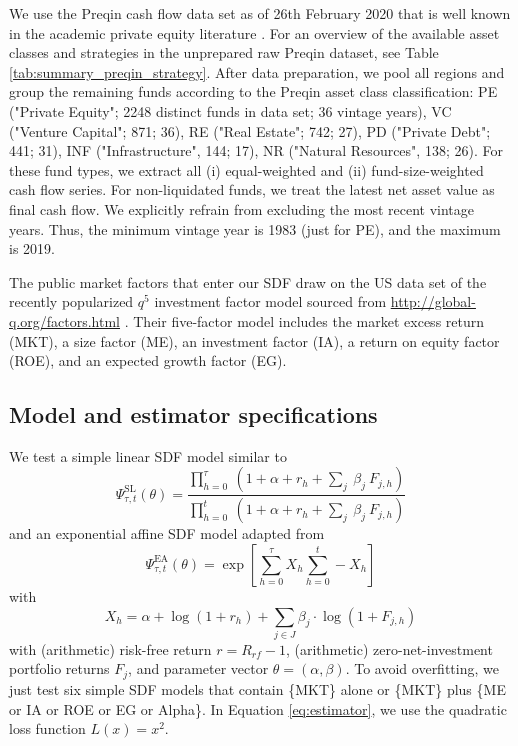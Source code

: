 \documentclass[12pt]{article}
\begin{document}
We use the Preqin cash flow data set as of 26th February 2020 that is well known in the academic private equity literature \citep{HJK14,KN16,ACGP18}.
For an overview of the available asset classes and strategies in the unprepared raw Preqin dataset, see Table  \ref{tab:summary_preqin_strategy}.
After data preparation, we pool all regions and group the remaining funds according to the Preqin asset class classification:
PE ("Private Equity"; 2248 distinct funds in data set; 36 vintage years),
VC ("Venture Capital"; 871; 36),
RE ("Real Estate"; 742; 27),
PD ("Private Debt"; 441; 31),
INF ("Infrastructure", 144; 17), 
NR ("Natural Resources", 138; 26).
For these fund types, we extract all (i) equal-weighted and (ii) fund-size-weighted cash flow series.
For non-liquidated funds, we treat the latest net asset value as final cash flow.
We explicitly refrain from excluding the most recent vintage years.
Thus, the minimum vintage year is 1983 (just for PE), and the maximum is 2019.

The public market factors that enter our SDF draw on the US data set of the recently popularized $q^5$ investment factor model sourced from \url{http://global-q.org/factors.html} \citep{HXZ15,HXZ20}. 
Their five-factor model includes the market excess return (MKT), a size factor (ME), an investment factor (IA), a return on equity factor (ROE), and an expected growth factor (EG).

\subsection{Model and estimator specifications}
\label{sec:model_selection}

We test a simple linear SDF model similar to \cite{DLP12}
\begin{equation}
\label{eq:linear_sdf}
\Psi_{\tau,t}^{\mathrm{SL}} (\theta) = 
\frac{\prod_{h=0}^{\tau}\ \left(1 + \alpha + r_{h} + \sum_j\ \beta_j \ F_{j,h} \right)}{\prod_{h=0}^{t}\ \left(1 + \alpha + r_{h} + \sum_j\ \beta_j\ F_{j,h} \right)}
\end{equation}
and an exponential affine SDF model adapted from \cite{KN16}
\begin{equation}
\label{eq:expaff_SDF}
\Psi_{\tau,t}^{\mathrm{EA}} (\theta) = 
\exp
\left[
\sum_{h=0}^{\tau} X_h
\sum_{h=0}^{t} - X_h
\right]
\end{equation}
with
\[
X_h = \alpha + \log (1 + r_h) + \sum_{j \in J} \beta_{j} \cdot \log (1 + F_{j,h})
\]
with (arithmetic) risk-free return $r=R_{rf}-1$, (arithmetic) zero-net-investment portfolio returns $F_j$, and parameter vector $\theta=(\alpha,\beta)$.
To avoid overfitting, we just test six simple SDF models that contain \{MKT\} alone or \{MKT\} plus \{ME or IA or ROE or EG or Alpha\}.
In Equation \ref{eq:estimator}, we use the quadratic loss function $L(x)=x^2$.
\end{document}
